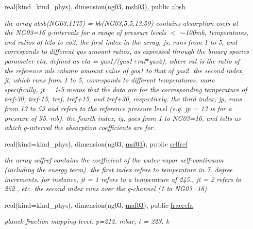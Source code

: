 \begin{DoxyCompactItemize}
real(kind=kind\+\_\+phys), dimension(ng03, \hyperlink{group__module__radlw__kgbnn_gac57ba9584cbc3a5e4e2e0a6b548d21e9}{msb03}), public \hyperlink{group__module__radlw__kgbnn_gaa84ba66e0a3cc018b03bd13c9c21e133}{absb}
\begin{DoxyCompactList}\small\item\em the array absb(\+N\+G03,1175) = kb(\+N\+G03,5,5,13\+:59) contains absorption coefs at the N\+G03=16 g-\/intervals for a range of pressure levels $<$ $\sim$100mb, temperatures, and ratios of h2o to co2. the first index in the array, js, runs from 1 to 5, and corresponds to different gas amount ratios, as expressed through the binary species parameter eta, defined as eta = gas1/(gas1+rat$\ast$gas2), where rat is the ratio of the reference mls column amount value of gas1 to that of gas2. the second index, jt, which runs from 1 to 5, corresponds to different temperatures. more specifically, jt = 1-\/5 means that the data are for the corresponding temperature of tref-\/30, tref-\/15, tref, tref+15, and tref+30, respectively. the third index, jp, runs from 13 to 59 and refers to the reference pressure level (e.\+g. jp = 13 is for a pressure of 95. mb). the fourth index, ig, goes from 1 to N\+G03=16, and tells us which g-\/interval the absorption coefficients are for. \end{DoxyCompactList}\item 
real(kind=kind\+\_\+phys), dimension(ng03, \hyperlink{group__module__radlw__kgbnn_gaf553bb46aa3ea6bcbb945cb2c2778955}{msf03}), public \hyperlink{group__module__radlw__kgbnn_ga6bb40d898660e6dfc056d3efe1d0c544}{selfref}
\begin{DoxyCompactList}\small\item\em the array selfref contains the coefficient of the water vapor self-\/continuum (including the energy term). the first index refers to temperature in 7. degree increments. for instance, jt = 1 refers to a temperature of 245., jt = 2 refers to 252., etc. the second index runs over the g-\/channel (1 to N\+G03=16). \end{DoxyCompactList}\item 
real(kind=kind\+\_\+phys), dimension(ng03, \hyperlink{group__module__radlw__kgbnn_ga90d1081db011f0682cb4a83c40c5bb23}{maf03}), public \hyperlink{group__module__radlw__kgbnn_ga26e901a002e789933c5c9b622f3a0932}{fracrefa}
\begin{DoxyCompactList}\small\item\em planck fraction mapping level\+: p=212. mbar, t = 223. k \end{DoxyCompactList}\item 

\end{DoxyCompactItemize}
